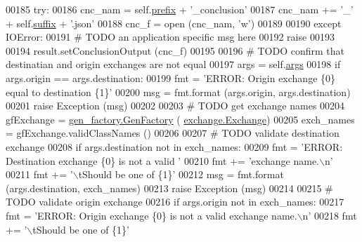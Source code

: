 \begin{DoxyCode}
{00185         \textcolor{keywordflow}{try}:
00186             cnc\_nam  =  self.\hyperlink{classe2e_1_1_application_a027ff25e5409ae17584978a09fc2611a}{prefix} + \textcolor{stringliteral}{'\_conclusion'}
00187             cnc\_nam += \textcolor{stringliteral}{'\_'} + self.\hyperlink{classe2e_1_1_application_a4d824ad36b051d2d629edb314385df0d}{suffix} + \textcolor{stringliteral}{'.json'}
00188             cnc\_f = open (cnc\_nam, \textcolor{stringliteral}{'w'})
00189             
00190         \textcolor{keywordflow}{except} IOError:
00191             \textcolor{comment}{# TODO an application specific msg here}
00192             \textcolor{keywordflow}{raise}
00193             
00194         result.setConclusionOutput (cnc\_f)
00195             
00196         \textcolor{comment}{# TODO confirm that destinatian and origin exchanges are not equal}
00197         args = self.\hyperlink{classe2e_1_1_application_abade6fc2e2c04ddd7e48137a2a7721bd}{args} 
00198         \textcolor{keywordflow}{if} args.origin == args.destination:
00199             fmt = \textcolor{stringliteral}{'ERROR: Origin exchange \{0\} equal to destination \{1\}'}
00200             msg = fmt.format (args.origin, args.destination)
00201             \textcolor{keywordflow}{raise} Exception (msg)
00202 
00203         \textcolor{comment}{# TODO get exchange names }
00204         gfExchange = \hyperlink{classgen__factory_1_1_gen_factory}{gen\_factory.GenFactory} (
      \hyperlink{classexchange_1_1_exchange}{exchange.Exchange})
00205         exch\_names = gfExchange.validClassNames ()
00206             
00207         \textcolor{comment}{# TODO validate destination exchange}
00208         \textcolor{keywordflow}{if} args.destination \textcolor{keywordflow}{not} \textcolor{keywordflow}{in} exch\_names:
00209             fmt  = \textcolor{stringliteral}{'ERROR: Destination exchange \{0\} is not a valid '}
00210             fmt += \textcolor{stringliteral}{'exchange name.\(\backslash\)n'}
00211             fmt += \textcolor{stringliteral}{'\(\backslash\)tShould be one of \{1\}'}
00212             msg = fmt.format (args.destination, exch\_names)
00213             \textcolor{keywordflow}{raise} Exception (msg)
00214             
00215         \textcolor{comment}{# TODO validate origin exchange}
00216         \textcolor{keywordflow}{if} args.origin \textcolor{keywordflow}{not} \textcolor{keywordflow}{in} exch\_names:
00217             fmt  = \textcolor{stringliteral}{'ERROR: Origin exchange \{0\} is not a valid exchange name.\(\backslash\)n'}
00218             fmt += \textcolor{stringliteral}{'\(\backslash\)tShould be one of \{1\}'}
}
\end{DoxyCode}

